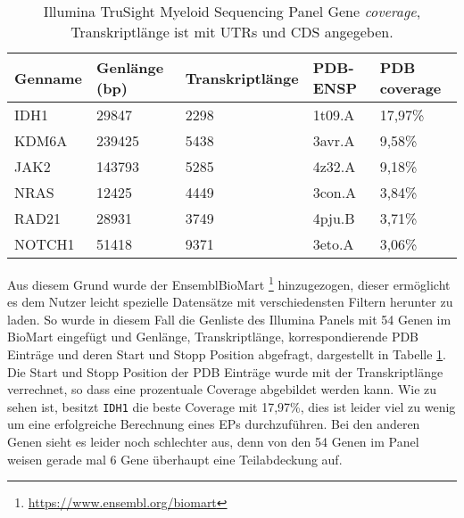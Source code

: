 \begin{table}[]
    \centering
    \begin{tabular}{lllll}
    \hline
    \multicolumn{1}{|l|}{Genname} & \multicolumn{1}{l|}{Genlänge (bp)} & \multicolumn{1}{l|}{Transkriptlänge} & \multicolumn{1}{l|}{PDB-ENSP} & \multicolumn{1}{l|}{PDB coverage} \\ \hline
    IDH1 & 29847 & 2298 & 1t09.A & 17,97\% \\
    KDM6A & 239425 & 5438 & 3avr.A & 9,58\% \\
    JAK2 & 143793 & 5285 & 4z32.A & 9,18\% \\
    NRAS & 12425 & 4449 & 3con.A & 3,84\% \\
    RAD21 & 28931 & 3749 & 4pju.B & 3,71\% \\
    NOTCH1 & 51418 & 9371 & 3eto.A & 3,06\% \\
    \end{tabular}
    \caption{Illumina TruSight Myeloid Sequencing Panel Gene \emph{coverage}, Transkriptlänge ist mit UTRs und CDS angegeben.}
    \label{tab:illumina_coverage}
\end{table}

Aus diesem Grund wurde der EnsemblBioMart \footnote{\url{https://www.ensembl.org/biomart}} hinzugezogen, dieser ermöglicht es dem Nutzer leicht spezielle Datensätze mit verschiedensten Filtern herunter zu laden. So wurde in diesem Fall die Genliste des Illumina Panels mit 54 Genen im BioMart eingefügt und Genlänge, Transkriptlänge, korrespondierende \ac{PDB} Einträge und deren Start und Stopp Position abgefragt, dargestellt in Tabelle \ref{tab:illumina_coverage}. Die Start und Stopp Position der \ac{PDB} Einträge wurde mit der Transkriptlänge verrechnet, so dass eine prozentuale Coverage abgebildet werden kann. Wie zu sehen ist, besitzt \texttt{IDH1} die beste Coverage mit 17,97\%, dies ist leider viel zu wenig um eine erfolgreiche Berechnung eines \ac{EPs} durchzuführen. Bei den anderen Genen sieht es leider noch schlechter aus, denn von den 54 Genen im Panel weisen gerade mal 6 Gene überhaupt eine Teilabdeckung auf. 

